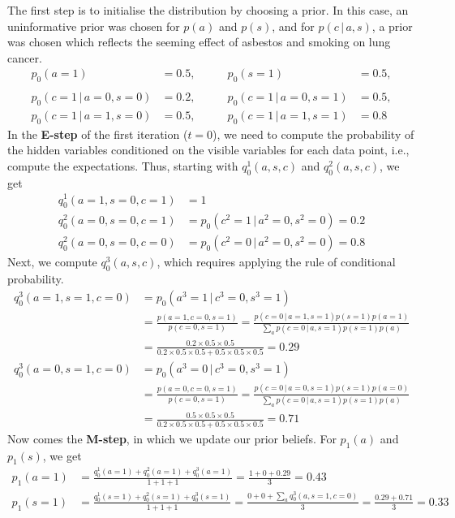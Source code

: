 \documentclass{article}
\newcommand{\giv}{\,|\,}
\begin{document}
\noindent The first step is to initialise the distribution by choosing a prior. In this case, an uninformative prior was chosen for $p(a)$ and $p(s)$, and for $p(c \giv a, s)$, a prior was chosen which reflects the seeming effect of asbestos and smoking on lung cancer. 
\begin{align*}
    p_0(a = 1) &= 0.5, \qquad& p_0(s = 1) &= 0.5, \\\\
    p_0(c = 1 \giv a = 0, s = 0) &= 0.2, \qquad&  p_0(c = 1 \giv a = 0, s = 1) &= 0.5, \\
    p_0(c = 1 \giv a = 1, s = 0) &= 0.5, \qquad&  p_0(c = 1 \giv a = 1, s = 1) &= 0.8
\end{align*}
\noindent In the \textbf{E-step} of the first iteration ($t=0$), we need to compute the probability of the hidden variables conditioned on the visible variables for each data point, i.e., compute the expectations. Thus, starting with $q_0^1(a, s, c)$ and $q_0^2(a, s, c)$, we get
\begin{align*}
    q_0^1(a = 1, s = 0, c = 1) &= 1\\
    q_0^2(a = 0, s = 0, c = 1) &= p_0(c^2 = 1 \giv a^2 = 0, s^2 = 0) = 0.2\\
    q_0^2(a = 0, s = 0, c = 0) &= p_0(c^2 = 0 \giv a^2 = 0, s^2 = 0) = 0.8
\end{align*}
\noindent Next, we compute $q_0^3(a, s, c)$, which requires applying the rule of conditional probability. 
\begin{align*}
    q_0^3(a = 1, s = 1, c = 0) &= p_0(a^3 = 1 \giv c^3 = 0, s^3 = 1)\\[1em]
    &= \frac{p(a=1, c=0, s=1)}{p(c=0, s=1)} = \frac{p(c=0 \giv a=1, s=1)p(s=1)p(a=1)}{\sum_a p(c=0 \giv a, s=1)p(s=1)p(a)}\\[1em]
    &= \frac{0.2 \times 0.5 \times 0.5}{0.2 \times 0.5 \times 0.5 + 0.5 \times 0.5 \times 0.5} = 0.29\\[1em]
    q_0^3(a = 0, s = 1, c = 0) &= p_0(a^3 = 0 \giv c^3 = 0, s^3 = 1)\\[1em]
    &= \frac{p(a=0, c=0, s=1)}{p(c=0, s=1)} = \frac{p(c=0 \giv a=0, s=1)p(s=1)p(a=0)}{\sum_a p(c=0 \giv a, s=1)p(s=1)p(a)}\\[1em]
    &= \frac{0.5 \times 0.5 \times 0.5}{0.2 \times 0.5 \times 0.5 + 0.5 \times 0.5 \times 0.5} = 0.71
\end{align*}
\noindent Now comes the \textbf{M-step}, in which we update our prior beliefs. For $p_1(a)$ and $p_1(s)$, we get
\begin{align*}
    p_1(a=1) &= \frac{q_0^1(a=1) + q_0^2(a=1) + q_0^3(a=1)}{1 + 1 + 1} = \frac{1 + 0 + 0.29}{3} = 0.43\\[1em]
    p_1(s=1) &= \frac{q_0^1(s=1) + q_0^2(s=1) + q_0^3(s=1)}{1 + 1 + 1} = \frac{0 + 0 + \sum_a q_0^3(a, s=1, c=0)}{3} = \frac{0.29 + 0.71}{3} = 0.33
\end{align*}
\end{document}
